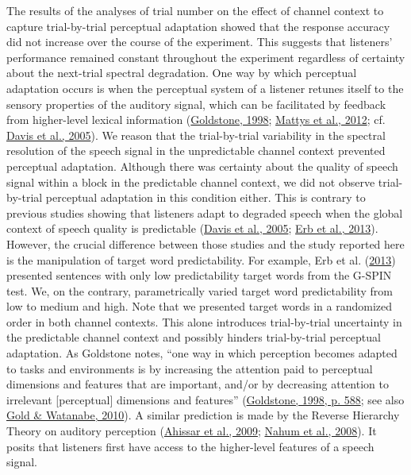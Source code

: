 \documentclass[a4paper, nobind]{templates/ociamthesis}
\begin{document}
The results of the analyses of trial number on the effect of channel context to capture trial-by-trial perceptual adaptation showed that the response accuracy did not increase over the course of the experiment.
This suggests that listeners' performance remained constant throughout the experiment regardless of certainty about the next-trial spectral degradation.
One way by which perceptual adaptation occurs is when the perceptual system of a listener retunes itself to the sensory properties of the auditory signal,
which can be facilitated by feedback from higher-level lexical information (\protect\hyperlink{ref-Goldstone1998}{Goldstone, 1998}; \protect\hyperlink{ref-Mattys2012}{Mattys et al., 2012}; cf. \protect\hyperlink{ref-Davis2005}{Davis et al., 2005}).
We reason that the trial-by-trial variability in the spectral resolution of the speech signal in the unpredictable channel context prevented perceptual adaptation.
Although there was certainty about the quality of speech signal within a block in the predictable channel context, we did not observe trial-by-trial perceptual adaptation in this condition either.
This is contrary to previous studies showing that listeners adapt to degraded speech when the global context of speech quality is predictable (\protect\hyperlink{ref-Davis2005}{Davis et al., 2005}; \protect\hyperlink{ref-Erb2013}{Erb et al., 2013}).
However, the crucial difference between those studies and the study reported here is the manipulation of target word predictability.
For example, Erb et al. (\protect\hyperlink{ref-Erb2013}{2013}) presented sentences with only low predictability target words from the G-SPIN test.
We, on the contrary, parametrically varied target word predictability from low to medium and high.
Note that we presented target words in a randomized order in both channel contexts.
This alone introduces trial-by-trial uncertainty in the predictable channel context and possibly hinders trial-by-trial perceptual adaptation.
As Goldstone notes, ``one way in which perception becomes adapted to tasks and environments is by increasing the attention paid to perceptual dimensions and features that are important, and/or by decreasing attention to irrelevant {[}perceptual{]} dimensions and features'' (\protect\hyperlink{ref-Goldstone1998}{Goldstone, 1998, p. 588}; see also \protect\hyperlink{ref-Gold2010}{Gold \& Watanabe, 2010}).
A similar prediction is made by the Reverse Hierarchy Theory on auditory perception (\protect\hyperlink{ref-Ahissar2009}{Ahissar et al., 2009}; \protect\hyperlink{ref-Nahum2008}{Nahum et al., 2008}).
It posits that listeners first have access to the higher-level features of a speech signal.
\end{document}
